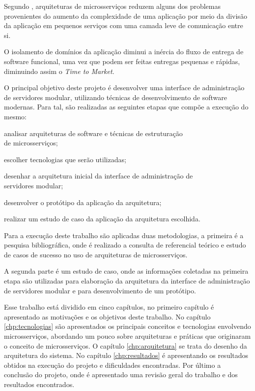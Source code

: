 Segundo , arquiteturas de microsserviços reduzem
alguns dos problemas provenientes do aumento da complexidade de uma aplicação
por meio da divisão da aplicação em pequenos serviços com uma camada leve
de comunicação entre si.

O isolamento de domínios da aplicação diminui a inércia do fluxo de entrega
de software funcional, uma vez que podem ser feitas entregas pequenas e
rápidas, diminuindo assim o \emph{Time to Market}.

O principal objetivo deste projeto é desenvolver uma interface de
administração de servidores modular, utilizando técnicas de desenvolvimento
de software modernas. Para tal, são realizadas as seguintes etapas que compõe
a execução do mesmo:

\begin{alineas}
  \item analisar arquiteturas de software e técnicas de estruturação \\
    de microsserviços;
  \item escolher tecnologias que serão utilizadas;
  \item desenhar a arquitetura inicial da interface de administração de \\
    servidores modular;
  \item desenvolver o protótipo da aplicação da arquitetura;
  \item realizar um estudo de caso da aplicação da arquitetura escolhida.
\end{alineas}

Para a execução deste trabalho são aplicadas duas metodologias, a primeira
é a pesquisa bibliográfica, onde é realizado a consulta de referencial
teórico e estudo de casos de sucesso no uso de arquiteturas de microsserviços.

A segunda parte é um estudo de caso, onde as informações coletadas
na primeira etapa são utilizadas para elaboração da arquitetura da interface
de administração de servidores modular e para desenvolvimento de um protótipo.

Esse trabalho está dividido em cinco capítulos, no primeiro capítulo é
apresentado as motivações e os objetivos deste trabalho. No capítulo
\ref{chp:tecnologias} são apresentados os principais conceitos e tecnologias
envolvendo microsserviços, abordando um pouco sobre arquiteturas
e práticas que originaram o conceito de microsserviços. O capítulo
\ref{chp:arquitetura} se trata do desenho da arquitetura do sistema. No
capítulo \ref{chp:resultados} é apresentando os resultados obtidos na execução
do projeto e dificuldades encontradas. Por último a conclusão do projeto,
onde é apresentado uma revisão geral do trabalho e dos resultados encontrados.
